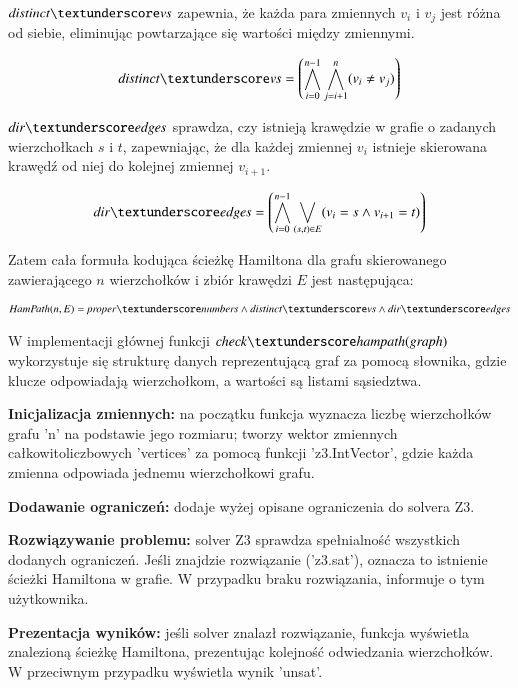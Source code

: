 $\distinctvs$ zapewnia, że każda para zmiennych \(v_i\) i \(v_j\) jest różna od siebie, eliminując powtarzające się wartości między zmiennymi.

\begin{align*}
	\distinctvs = \left( \bigwedge_{i=0}^{n-1} \bigwedge_{j=i+1}^{n} (v_i \neq v_j) \right)
\end{align*}

$\diredges$ sprawdza, czy istnieją krawędzie w grafie o zadanych wierzchołkach \(s\) i \(t\), zapewniając, że dla każdej zmiennej \(v_i\) istnieje skierowana krawędź od niej do kolejnej zmiennej \(v_{i+1}\).​

\begin{align*}
	\diredges = \left( \bigwedge_{i=0}^{n-1} \bigvee_{(s,t) \in E} (v_i = s \land v_{i+1} = t) \right)
\end{align*}

\vspace{1cm}

Zatem cała formuła kodująca ścieżkę Hamiltona dla grafu skierowanego zawierającego \(n\) wierzchołków i zbiór krawędzi \(E\) jest następująca:

\begin{align*}
	\HamPath(n, E) = \propernumbers \land \distinctvs \land \diredges
\end{align*}

W implementacji głównej funkcji $\checkhampath$ wykorzystuje się strukturę danych reprezentującą graf za pomocą słownika, gdzie klucze odpowiadają wierzchołkom, a wartości są listami sąsiedztwa.

\textbf{Inicjalizacja zmiennych: } na początku funkcja wyznacza liczbę wierzchołków grafu 'n' na podstawie jego rozmiaru; tworzy wektor zmiennych całkowitoliczbowych 'vertices' za pomocą funkcji 'z3.IntVector', gdzie każda zmienna odpowiada jednemu wierzchołkowi grafu.
	
\textbf{Dodawanie ograniczeń: } dodaje wyżej opisane ograniczenia do solvera Z3.

\textbf{Rozwiązywanie problemu: } solver Z3 sprawdza spełnialność wszystkich dodanych ograniczeń. Jeśli znajdzie rozwiązanie ('z3.sat'), oznacza to istnienie ścieżki Hamiltona w grafie. W przypadku braku rozwiązania, informuje o tym użytkownika.

\textbf{Prezentacja wyników: } jeśli solver znalazł rozwiązanie, funkcja wyświetla znalezioną ścieżkę Hamiltona, prezentując kolejność odwiedzania wierzchołków. W przeciwnym przypadku wyświetla wynik 'unsat'.

